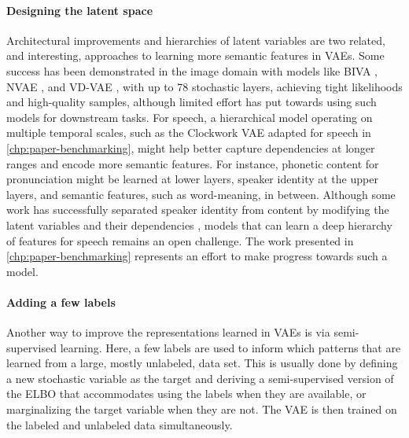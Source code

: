 \paragraph{Designing the latent space} 
Architectural improvements and hierarchies of latent variables are two related, and interesting, approaches to learning more semantic features in VAEs. 
Some success has been demonstrated in the image domain with models like BIVA \parencite{maaloe_biva_2019}, NVAE \parencite{vahdat_nvae_2020}, and VD-VAE \parencite{child_very_2021}, with up to 78 stochastic layers, achieving tight likelihoods and high-quality samples, although limited effort has put towards using such models for downstream tasks. 
For speech, a hierarchical model operating on multiple temporal scales, such as the Clockwork VAE \parencite{saxena_clockwork_2021} adapted for speech in \cref{chp:paper-benchmarking}, might help better capture dependencies at longer ranges and encode more semantic features. 
For instance, phonetic content for pronunciation might be learned at lower layers, speaker identity at the upper layers, and semantic features, such as word-meaning, in between. 
Although some work has successfully separated speaker identity from content by modifying the latent variables and their dependencies \parencite{hsu_unsupervised_2017}, models that can learn a deep hierarchy of features for speech remains an open challenge. The work presented in \cref{chp:paper-benchmarking} represents an effort to make progress towards such a model. 


\paragraph{Adding a few labels} 
Another way to improve the representations learned in VAEs is via semi-supervised learning. 
Here, a few labels are used to inform which patterns that are learned from a large, mostly unlabeled, data set. 
This is usually done by defining a new stochastic variable as the target and deriving a semi-supervised version of the ELBO that accommodates using the labels when they are available, or marginalizing the target variable when they are not. The VAE is then trained on the labeled and unlabeled data simultaneously. 

